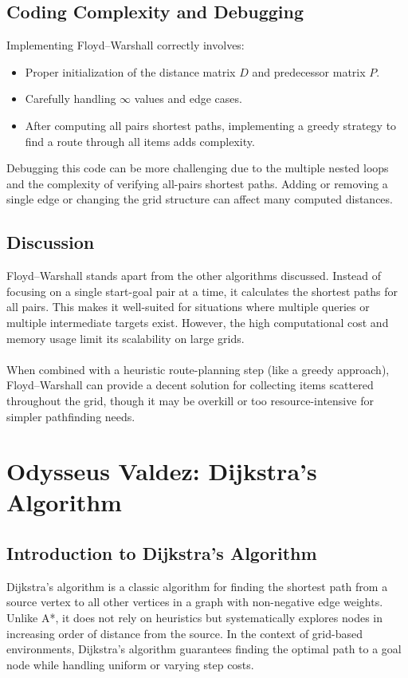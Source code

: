 \documentclass[12pt]{article}
\begin{document}
\subsection{Coding Complexity and Debugging}
Implementing Floyd–Warshall correctly involves:
\begin{itemize}
    \item Proper initialization of the distance matrix \( D \) and predecessor matrix \( P \).
    \item Carefully handling \(\infty\) values and edge cases.
    \item After computing all pairs shortest paths, implementing a greedy strategy to find a route through all items adds complexity.
\end{itemize}

\noindent Debugging this code can be more challenging due to the multiple nested loops and the complexity of verifying all-pairs shortest paths. Adding or removing a single edge or changing the grid structure can affect many computed distances.

\subsection{Discussion}
Floyd–Warshall stands apart from the other algorithms discussed. Instead of focusing on a single start-goal pair at a time, it calculates the shortest paths for all pairs. This makes it well-suited for situations where multiple queries or multiple intermediate targets exist. However, the high computational cost and memory usage limit its scalability on large grids.
\\
\\
When combined with a heuristic route-planning step (like a greedy approach), Floyd–Warshall can provide a decent solution for collecting items scattered throughout the grid, though it may be overkill or too resource-intensive for simpler pathfinding needs.
\newpage










\section{Odysseus Valdez: Dijkstra's Algorithm}
\subsection{Introduction to Dijkstra's Algorithm}
Dijkstra's algorithm is a classic algorithm for finding the shortest path from a source vertex to all other vertices in a graph with non-negative edge weights. Unlike A*, it does not rely on heuristics but systematically explores nodes in increasing order of distance from the source. In the context of grid-based environments, Dijkstra's algorithm guarantees finding the optimal path to a goal node while handling uniform or varying step costs.
\end{document}
